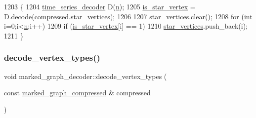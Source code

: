 \begin{DoxyCode}
1203 \{
1204   \hyperlink{classtime__series__decoder}{time\_series\_decoder} D(\hyperlink{classmarked__graph__decoder_aefc93611bc4a3e9a5d3956d97649a0e9}{n});
1205   \hyperlink{classmarked__graph__decoder_a5c5391206cf2965b8513248e505ba48f}{is\_star\_vertex} = D.decode(compressed.\hyperlink{classmarked__graph__compressed_a7a4ced4586e2e353f9076bd447df5208}{star\_vertices});
1206 
1207   \hyperlink{classmarked__graph__decoder_a06fc05827db14b675f7ecc2fd915b533}{star\_vertices}.clear();
1208   \textcolor{keywordflow}{for} (\textcolor{keywordtype}{int} i=0;i<\hyperlink{classmarked__graph__decoder_aefc93611bc4a3e9a5d3956d97649a0e9}{n};i++)
1209     \textcolor{keywordflow}{if} (\hyperlink{classmarked__graph__decoder_a5c5391206cf2965b8513248e505ba48f}{is\_star\_vertex}[i] == 1)
1210       \hyperlink{classmarked__graph__decoder_a06fc05827db14b675f7ecc2fd915b533}{star\_vertices}.push\_back(i);
1211 \}
\end{DoxyCode}
\mbox{\label{classmarked__graph__decoder_afc0aea714483a4dda31dd85fd20bfe5f}} 
\subsubsection{\texorpdfstring{decode\+\_\+vertex\+\_\+types()}{decode\_vertex\_types()}}
{\footnotesize\ttfamily void marked\+\_\+graph\+\_\+decoder\+::decode\+\_\+vertex\+\_\+types (\begin{DoxyParamCaption}\item[{const \hyperlink{classmarked__graph__compressed}{marked\+\_\+graph\+\_\+compressed} \&}]{compressed }\end{DoxyParamCaption})\hspace{0.3cm}{\ttfamily [private]}}


